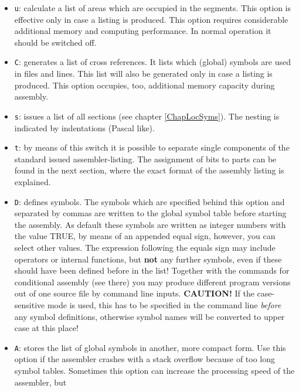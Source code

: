 \documentclass[12pt,twoside]{report}
\newcommand{\bb}[1]{{\bf #1}}
\newcommand{\tty}[1]{{\tt #1}}
\begin{document}
\begin{itemize}
{      assembler shall automatically search for include
      files, in case it didn't find a file in the
      current directory.  The different directories
      have to be separated by semicolons.}
\item{\tty{u}: calculate a list of areas which are occupied in the segments.
      This option is effective only in case a listing is
      produced. This option requires considerable additional
      memory and computing performance. In normal operation it
      should be switched off.}
\item{\tty{C}: generates a list of cross references.  It lists which (global)
      symbols are used in files and lines.  This list will also be
      generated only in case a listing is produced.  This option
      occupies, too, additional memory capacity during assembly.}
\item{\tty{s}: issues a list of all sections (see chapter
      \ref{ChapLocSyms}).  The nesting is indicated  by indentations
      (Pascal like).}
\item{\tty{t}: by means of this switch it is possible to separate single
      components of the standard issued assembler-listing.  The assignment
      of bits to parts can be found in the next section, where the exact
      format of the assembly listing is explained.}
\item{\tty{D}: defines symbols.  The symbols which are specified behind this
      option and separated by commas are written to the
      global symbol table before starting the assembly.  As default
      these symbols are written as integer numbers with the
      value TRUE, by means of an appended equal sign, however, you
      can select other values.  The expression following the equals
      sign may include operators or internal functions, but \bb{not}
      any further symbols, even if these should have been defined
      before in the list!  Together with the commands for
      conditional assembly (see there) you may produce different
      program versions out of one source file by command line
      inputs. {\bf CAUTION!} If the case-sensitive mode is used, this has
      to be specified in the command line {\em before} any symbol
      definitions, otherwise symbol names will be converted to upper
      case at this place!}
\item{\tty{A}: stores the list of global symbols in another, more compact
      form.  Use this option if the assembler crashes with a stack
      overflow because of too long symbol tables.  Sometimes this
      option can increase the processing speed of the assembler, but
}
\end{itemize}
\end{document}
